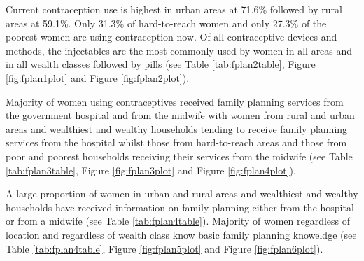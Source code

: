 \documentclass[12pt,a4paper]{article}
\begin{document}
Current contraception use is highest in urban areas at 71.6\% followed by rural areas at 59.1\%. Only 31.3\% of hard-to-reach women and only 27.3\% of the poorest women are using contraception now. Of all contraceptive devices and methods, the injectables are the most commonly used by women in all areas and in all wealth classes followed by pills (see Table \ref{tab:fplan2table}, Figure \ref{fig:fplan1plot} and Figure \ref{fig:fplan2plot}).

Majority of women using contraceptives received family planning services from the government hospital and from the midwife with women from rural and urban areas and wealthiest and wealthy households tending to receive family planning services from the hospital whilst those from hard-to-reach areas and those from poor and poorest households receiving their services from the midwife (see Table \ref{tab:fplan3table}, Figure \ref{fig:fplan3plot} and Figure \ref{fig:fplan4plot}).

A large proportion of women in urban and rural areas and wealthiest and wealthy households have received information on family planning either from the hospital or from a midwife (see Table \ref{tab:fplan4table}). Majority of women regardless of location and regardless of wealth class know basic family planning knoweldge (see Table \ref{tab:fplan4table}, Figure \ref{fig:fplan5plot} and Figure \ref{fig:fplan6plot}).
\end{document}
